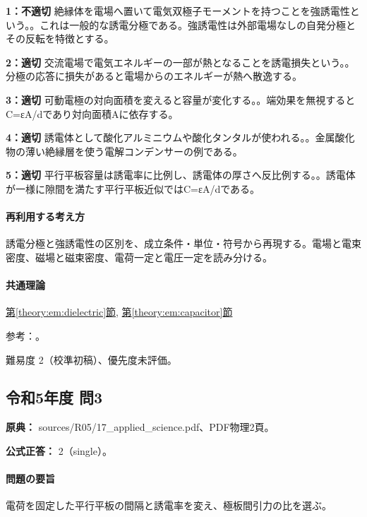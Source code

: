 \noindent\textbf{1：不適切} 絶縁体を電場へ置いて電気双極子モーメントを持つことを強誘電性という。。これは一般的な誘電分極である。強誘電性は外部電場なしの自発分極とその反転を特徴とする。\par

\noindent\textbf{2：適切} 交流電場で電気エネルギーの一部が熱となることを誘電損失という。。分極の応答に損失があると電場からのエネルギーが熱へ散逸する。\par

\noindent\textbf{3：適切} 可動電極の対向面積を変えると容量が変化する。。端効果を無視するとC=εA/dであり対向面積Aに依存する。\par

\noindent\textbf{4：適切} 誘電体として酸化アルミニウムや酸化タンタルが使われる。。金属酸化物の薄い絶縁層を使う電解コンデンサーの例である。\par

\noindent\textbf{5：適切} 平行平板容量は誘電率に比例し、誘電体の厚さへ反比例する。。誘電体が一様に隙間を満たす平行平板近似ではC=εA/dである。\par

\paragraph{再利用する考え方} 誘電分極と強誘電性の区別を、成立条件・単位・符号から再現する。電場と電束密度、磁場と磁束密度、電荷一定と電圧一定を読み分ける。

\paragraph{共通理論} \hyperref[theory:em:dielectric]{第\ref*{theory:em:dielectric}節}, \hyperref[theory:em:capacitor]{第\ref*{theory:em:capacitor}節}

\par 参考：\cite{mit_em05,mit_ferroelectric}。

\par 難易度 2（校準初稿）、優先度未評価。

\subsection{令和5年度 問3}
\label{q:r05-reg-applied-03}

\noindent\textbf{原典：} sources/R05/17\_applied\_science.pdf、PDF物理2頁。

\textbf{公式正答：} 2（single）。

\paragraph{問題の要旨} 電荷を固定した平行平板の間隔と誘電率を変え、極板間引力の比を選ぶ。

